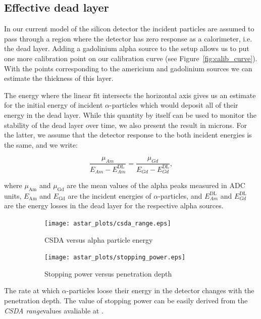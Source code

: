 \documentclass[a4paper,12pt]{article}
\begin{document}
\subsection{Effective dead layer}

In our current model of the silicon detector the incident particles are assumed
to pass through a region where the detector has zero response as a calorimeter,
i.e. the dead layer. Adding a gadolinium alpha source to the setup allows us to
put one more calibration point on our calibration curve (see
Figure~\ref{fig:calib_curve}). With the points corresponding to the americium
and gadolinium sources we can estimate the thickness of this layer.

The energy where the linear fit intersects the horizontal axis gives us an
estimate for the initial energy of incident $\alpha$-particles which would
deposit all of their energy in the dead layer. While this quantity by itself
can be used to monitor the stability of the dead layer over time, we also
present the result in microns. For the latter, we assume that the detector
response to the both incident energies is the same, and we write:

\begin{equation}
\frac{\mu_{Am}}{E_{Am} - E^\text{DL}_{Am}} = \frac{\mu_{Gd}}{E_{Gd} - E^\text{DL}_{Gd}},
\label{eq:gain_equality}
\end{equation}

\noindent where $\mu_\text{Am}$ and $\mu_\text{Gd}$ are the mean values of the
alpha peaks measured in ADC units, $E_\text{Am}$ and $E_\text{Gd}$ are the
incident energies of $\alpha$-particles, and $E^\text{DL}_{Am}$ and
$E^\text{DL}_{Gd}$ are the energy losses in the dead layer for the respective
alpha sources.

\begin{figure}
\begin{subfigure}[b]{0.5\textwidth}
\texttt{[image: astar\_plots/csda\_range.eps]}
\caption{CSDA versus alpha particle energy}\label{subfig:csda_range}
\end{subfigure}
\begin{subfigure}[b]{0.5\textwidth}
\texttt{[image: astar\_plots/stopping\_power.eps]}
\caption{Stopping power versus penetration depth}\label{subfig:stopping_power}
\end{subfigure}
\caption{}\label{fig:astar_plots}
\end{figure}

The rate at which $\alpha$-particles loose their energy in the detector changes
with the penetration depth. The value of stopping power can be easily derived
from the \emph{CSDA range}\footnotemark values avaliable at \cite{astar_database}.
\end{document}
